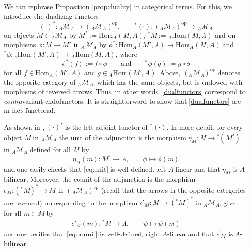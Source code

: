 \documentclass{article}
\theoremstyle{definition}
\begin{document}
	
	We can rephrase Proposition \ref{prop:duality} in categorical terms. 
	For this, we introduce the dualizing functors
	\begin{equation}\label{dualfunctors}
		(\cdot)^*\colon{}_A\mathcal{M}_A\to({}_A\mathcal{M}_A)^\mathrm{op},\qquad
		{}^*(\cdot)\colon({}_A\mathcal{M}_A)^\mathrm{op}\to{}_A\mathcal{M}_A
	\end{equation}
	on objects $M\in{}_A\mathcal{M}_A$ by $M^*:=\mathrm{Hom}_A(M,A)$, ${}^*M:={}_A\mathrm{Hom}(M,A)$ and on morphisms $\phi\colon M\to M'$ in ${}_A\mathcal{M}_A$ by $\phi^*\colon\mathrm{Hom}_A(M',A)\to\mathrm{Hom}_A(M,A)$ and ${}^*\phi\colon{}_A\mathrm{Hom}(M',A)\to{}_A\mathrm{Hom}(M,A)$, where
	\begin{equation}\label{eq:DualFuncMorph}
		\phi^*(f):=f\circ\phi\qquad\text{and}\qquad{}^*\phi(g):=g\circ\phi
	\end{equation}
	for all $f\in\mathrm{Hom}_A(M',A)$ and $g\in{}_A\mathrm{Hom}(M',A)$. Above, $({}_A\mathcal{M}_A)^\mathrm{op}$ denotes the opposite category of ${}_A\mathcal{M}_A$, which has the same objects, but is endowed with morphisms of reversed arrows. Thus, in other words, \eqref{dualfunctors} correspond to \textit{contra}variant endofunctors. It is straightforward to show that \eqref{dualfunctors} are in fact functorial.
	
	
	
	As shown in \cite[Proposition 9]{PoinsotPorst}, $(\cdot)^*$ is the left adjoint functor of ${}^*(\cdot)$. In more detail, for every object $M$ in ${}_A\mathcal{M}_A$ the unit of the adjunction is the morphism $\eta_M\colon M\to{}^*(M^*)$ in ${}_A\mathcal{M}_A$ defined for all $M$ by
	\begin{equation}\label{eq:unit}
		\eta_M(m)\colon M^*\to A,\qquad\phi\mapsto\phi(m)
	\end{equation}
	and one easily checks that \eqref{eq:unit} is well-defined, left $A$-linear and that $\eta_M$ is $A$-bilinear. Moreover, the counit of the adjunction is the morphism $\epsilon_M\colon({}^*M)^*\to M$ in $({}_A\mathcal{M}_A)^\mathrm{op}$ (recall that the arrows in the opposite categories are reversed) corresponding to the morphism $\epsilon'_M\colon M\to({}^*M)^*$ in ${}_A\mathcal{M}_A$, given for all $m\in M$ by
	\begin{equation}\label{eq:counit}
		\begin{split}
			\epsilon'_M(m)\colon{}^*M\to A,\qquad\psi\mapsto\psi(m)
		\end{split}
	\end{equation}
	and one verifies that \eqref{eq:counit} is well-defined, right $A$-linear and that $\epsilon'_M$ is $A$-bilinear.
	
\end{document}
